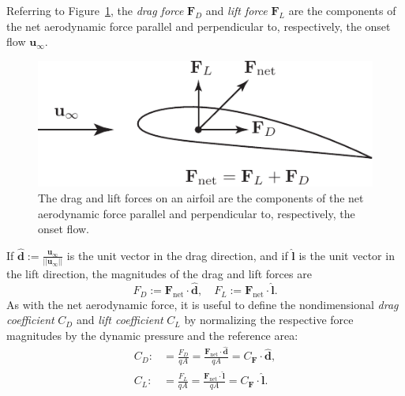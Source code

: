\documentclass[10pt,fleqn,reqno]{article}
\newcommand\defn[1]{\emph{#1}}
\newcommand\norm[1]{||{#1}||}
\newcommand\figref[1]{\mbox{Figure \ref{#1}}}
\begin{document}
Referring to \figref{fig:drag-lift}, the \defn{drag force} $\mathbf F_D$ and \defn{lift force} $\mathbf F_L$ are the components of the net aerodynamic force parallel and perpendicular to, respectively, the onset flow $\mathbf u_\infty$.
\begin{figure}[H]
\begin{center}
\includegraphics[scale=.8]{Figures/drag-lift.pdf}
\caption{The drag and lift forces on an airfoil are the components of the net aerodynamic force parallel and perpendicular to, respectively, the onset flow.}\label{fig:drag-lift}
\end{center}
\end{figure}
If $\hat{\mathbf d}:=\frac{\mathbf u_\infty}{\norm{\mathbf u_\infty}}$ is the unit vector in the drag direction, and if $\hat{\mathbf l}$ is the unit vector in the lift direction, the magnitudes of the drag and lift forces are \[F_D:=\mathbf F_\text{net}\cdot\hat{\mathbf d},\quad F_L:=\mathbf F_\text{net}\cdot\hat{\mathbf l}.\]  As with the net aerodynamic force, it is useful to define the nondimensional \defn{drag coefficient} $C_D$ and \defn{lift coefficient} $C_L$ by normalizing the respective force magnitudes by the dynamic pressure and the reference area:
\begin{align*}
C_D:&=\frac{F_D}{qA}=\frac{\mathbf F_\text{net}\cdot\hat{\mathbf d}}{qA} = C_{\mathbf F}\cdot\hat{\mathbf d},\\
C_L:&=\frac{F_L}{qA}=\frac{\mathbf F_\text{net}\cdot\hat{\mathbf l}}{qA} = C_{\mathbf F}\cdot\hat{\mathbf l}.
\end{align*}
\end{document}
